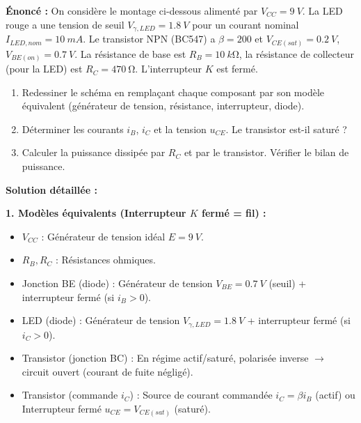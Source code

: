\documentclass[11pt]{article}
\begin{document}
\begin{exoresolu}
\textbf{Énoncé :} On considère le montage ci-dessous alimenté par $V_{CC} = \SI{9}{V}$. La LED rouge a une tension de seuil $V_{\gamma,LED} = \SI{1,8}{V}$ pour un courant nominal $I_{LED,nom} = \SI{10}{mA}$. Le transistor NPN (BC547) a $\beta = 200$ et $V_{CE(sat)} = \SI{0,2}{V}$, $V_{BE(on)} = \SI{0,7}{V}$. La résistance de base est $R_B = \SI{10}{k\ohm}$, la résistance de collecteur (pour la LED) est $R_C = \SI{470}{\ohm}$. L'interrupteur $K$ est fermé.
\begin{enumerate}
\item Redessiner le schéma en remplaçant chaque composant par son modèle équivalent (générateur de tension, résistance, interrupteur, diode).
\item Déterminer les courants $i_B$, $i_C$ et la tension $u_{CE}$. Le transistor est-il saturé ?
\item Calculer la puissance dissipée par $R_C$ et par le transistor. Vérifier le bilan de puissance.
\end{enumerate}


\tcblower
\textbf{Solution détaillée :}

\textbf{1. Modèles équivalents (Interrupteur $K$ fermé = fil) :}
\begin{itemize}
\item $V_{CC}$ : Générateur de tension idéal $E = \SI{9}{V}$.
\item $R_B, R_C$ : Résistances ohmiques.
\item Jonction BE (diode) : Générateur de tension $V_{BE} = \SI{0,7}{V}$ (seuil) + interrupteur fermé (si $i_B>0$).
\item LED (diode) : Générateur de tension $V_{\gamma,LED} = \SI{1,8}{V}$ + interrupteur fermé (si $i_C>0$).
\item Transistor (jonction BC) : En régime actif/saturé, polarisée inverse $\to$ circuit ouvert (courant de fuite négligé).
\item Transistor (commande $i_C$) : Source de courant commandée $i_C = \beta i_B$ (actif) ou Interrupteur fermé $u_{CE}=V_{CE(sat)}$ (saturé).
\end{itemize}


\end{exoresolu}
\end{document}
